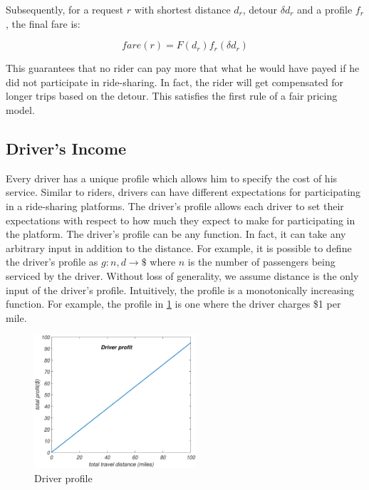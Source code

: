 Subsequently, for a request $r$ with shortest distance $d_r$, detour $\delta d_r$ and a profile $f_r$, the final fare is:

\begin{equation}
\label{eq:fare}
fare(r) = F(d_r) f_r(\delta d_r)
\end{equation}

This guarantees that no rider can pay more that what he would have payed if he did not participate in ride-sharing. In fact, the rider will get compensated for longer trips based on the detour. This satisfies the first rule of a fair pricing model. 

\subsection{Driver's Income}

Every driver has a unique profile which allows him to specify the cost of his service. Similar to riders, drivers can have different expectations for participating in a ride-sharing platforms. The driver's profile allows each driver to set their expectations with respect to how much they expect to make for participating in the platform. The driver's profile can be any function. In fact, it can take any arbitrary input in addition to the distance. For example, it is possible to define the driver's profile as $g: n, d \rightarrow \$$ where $n$ is the number of passengers being serviced by the driver. Without loss of generality, we assume distance is the only input of the driver's profile. Intuitively, the profile is a monotonically increasing function. For example, the profile in \cref{fig:driver_profile} is one where the driver charges \$1 per mile.

\begin{figure}[!ht]
	\centering
	\includegraphics[width = 60mm]{fig/driver.eps}
	\vspace{-0mm}\caption{Driver profile} \vspace{-2mm} \label{fig:driver_profile}
\end{figure}\vspace{-0mm}
 

